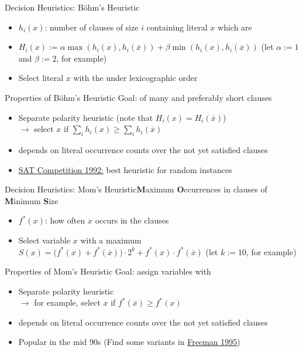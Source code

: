 \documentclass[t]{sdqbeamer}
\begin{document}
\begin{frame}{Decision Heuristics: Böhm's Heuristic}
\begin{itemize}\setlength{\itemsep}{1ex}
	\item $h_i(x)$: number of clauses of size $i$ containing literal $x$ which are 
	\item $H_i(x) := \alpha \operatorname{max}(h_i(x), h_i(\overline{x})) + \beta \operatorname{min}(h_i(x), h_i(\overline{x}))$ \quad (let $\alpha:=1$ and $\beta:=2$, for example)
	\item Select literal $x$ with the  under lexicographic order
\end{itemize}
\begin{block}{Properties of Böhm's Heuristic}
Goal:  of many and preferably short clauses\\[1ex]
\begin{itemize}\setlength{\itemsep}{1em}
	\item Separate polarity heuristic (note that $H_i(x) = H_i(\overline x)$)\\[1ex]
		$\rightarrow$ select $x$ if $\sum_i h_i(x) \geq \sum_i h_i(\overline x)$
	\item depends on literal occurrence counts over the not yet satisfied clauses
	\item \href{https://stamm-wilbrandt.de/en/Report_on_a_SAT_competition.pdf}{SAT Competition 1992:} best heuristic for random instances
\end{itemize}
\end{block}
\end{frame}
	
\begin{frame}{Decision Heuristics: Mom's Heuristic}{\textbf{M}aximum \textbf{O}ccurrences in clauses of \textbf{M}inimum \textbf{S}ize}
\begin{itemize}\setlength{\itemsep}{1ex}
	\item $f^*(x)$: how often $x$ occurs in the  clauses
	\item Select variable $x$ with a maximum $S(x) = \bigl(f^*(x)+f^*(\overline{x})\bigr) \cdot 2^k + f^*(x) \cdot f^*(\overline{x})$ \quad (let $k:=10$, for example)
\end{itemize}
\begin{block}{Properties of Mom's Heuristic}
Goal: assign variables with \\[1ex]
\begin{itemize}\setlength{\itemsep}{1em}
	\item Separate polarity heuristic\\[1ex]
		$\rightarrow$ for example, select $x$ if $f^*(\overline x) \geq f^*(x)$
	\item depends on literal occurrence counts over the not yet satisfied clauses
	\item Popular in the mid 90s (Find some variants in \href{https://satlecture.github.io/kit2024/references/1995_Freeman_Thesis.ps}{Freeman 1995})
\end{itemize}
\end{block}
\end{frame}
	
\end{document}
